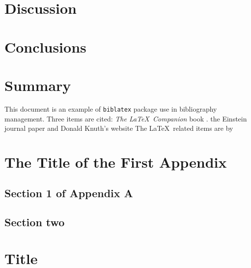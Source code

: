 \documentclass[doublespace,nopageskip]{UVAthesis}
\begin{document}
	\chapter{Discussion} \label{ch:discussion}
	\lipsum[6-12]
	\chapter{Conclusions} \label{ch:conclusions}
	\lipsum[5-11]
	\chapter{Summary} \label{ch:summary}
	\lipsum[1-3]
	
	This document is an example of \texttt{biblatex} package use in bibliography 
        management.
        Three items are cited: \textit{The \LaTeX\ Companion} book \cite{latexcompanion}. %
        the Einstein journal paper %
        and Donald Knuth's website %
        The \LaTeX\ related items are by %
        

	\printbibliography[heading=bibintoc]
	   

	\appendix

	\begin{appendices}
		\chapter{The Title of the First Appendix}
		\label{app:appendixA}
		\lipsum[3]
			\section{Section 1 of Appendix A} \label{app:appendixA_1}
			\lipsum[4]
				
			\section{Section two} \label{app:appendixA_2}
			\lipsum[5]
				
		\chapter{Title} 
		\label{app:appendixB}
			\lipsum[6-7]
	\end{appendices}
\end{document}
